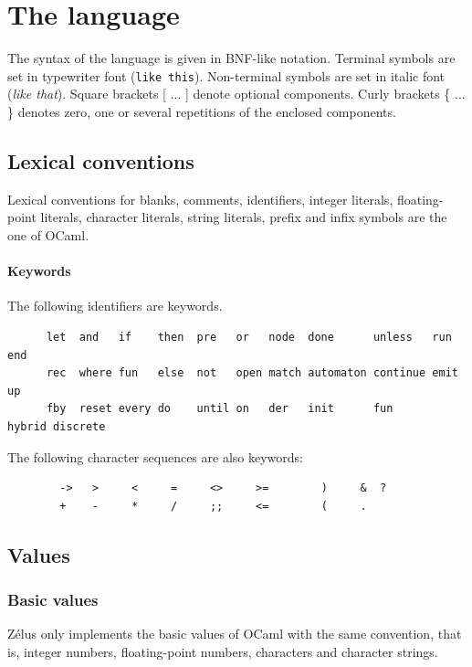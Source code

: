 \documentclass[11pt,titlepage,twoside]{report}
\newcommand{\zelus}{{\sf Z\'elus}}
\newcommand{\ocaml}{{\sf OCaml}}
\newcommand{\term}[1]{{\tt #1}}
\newcommand{\nterm}[1]{{\em #1}}
\begin{document}
\chapter{The language}


The syntax of the language is given in BNF-like notation. Terminal
symbols are set in typewriter font (\term{like this}). Non-terminal symbols
are set in italic font (\nterm{like that}). Square brackets [ ... ] denote
optional components. Curly brackets \{ ... \} denotes zero, one or several
repetitions of the enclosed components.


\section{Lexical conventions}

Lexical conventions for blanks, comments, identifiers, integer
literals, floating-point literals, character literals, string
literals, prefix and infix symbols are the one of \ocaml.

\subsubsection{Keywords}
The following identifiers are keywords.

\begin{verbatim}
      let  and   if    then  pre   or   node  done      unless   run    end
      rec  where fun   else  not   open match automaton continue emit   up
      fby  reset every do    until on   der   init      fun      hybrid discrete
\end{verbatim}
The following character sequences are also keywords:

\begin{verbatim}
        ->   >     <     =     <>     >=        )     &  ?
        +    -     *     /     ;;     <=        (     .
\end{verbatim}

\section{Values}

\subsection{Basic values}
\zelus{} only implements the basic values of \ocaml{} with the same
convention, that is, integer numbers, floating-point numbers,
characters and character strings.
\end{document}
